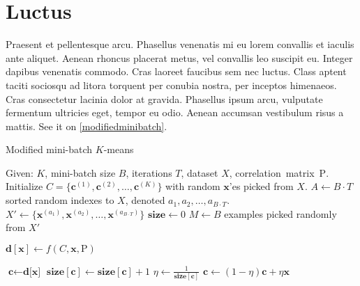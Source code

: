\section{Luctus}
Praesent et pellentesque arcu. Phasellus venenatis mi eu lorem convallis et iaculis ante aliquet. Aenean rhoncus placerat metus, vel convallis leo suscipit eu. Integer dapibus venenatis commodo. Cras laoreet faucibus sem nec luctus. Class aptent taciti sociosqu ad litora torquent per conubia nostra, per inceptos himenaeos. Cras consectetur lacinia dolor at gravida. Phasellus ipsum arcu, vulputate fermentum ultricies eget, tempor eu odio. Aenean accumsan vestibulum risus a mattis. See it on \cref{modifiedminibatch}.

\begin{algorithm}
\caption{Modified mini-batch $K$-means} \label{modifiedminibatch}
\begin{algorithmic}[1]
\State Given: $K$, mini-batch size $B$, iterations $T$, dataset $X$, correlation~matrix~$\mathrm{P}$.
\State Initialize $C = \{\mathbf{c}^{(1)}, \mathbf{c}^{(2)}, \ldots, \mathbf{c}^{(K)}\}$ with random $\mathbf{x}$'es picked from $X$.
\State $A \gets B \cdot T$ sorted random indexes to $X$, denoted $a_1, a_2, \ldots, a_{B\cdot T}$.
\State $X' \gets \{\mathbf{x}^{(a_1)}, \mathbf{x}^{(a_2)}, \ldots, \mathbf{x}^{(a_{B\cdot T})}\}$ 
\State $\textbf{size} \gets 0$
    \State $M \gets B$ examples picked randomly from $X'$
    
     
        \State $\textbf{d}[\textbf{x}] \gets f(C,\mathbf{x}, \mathrm{P})$ 
    \EndFor
    
     
        \State $\textbf{c} \gets \textbf{d[x]}$ 
        \State $\textbf{size}[\textbf{c}] \gets \textbf{size}[\textbf{c}] + 1$ 
        \State $\eta \gets \frac{1}{\textbf{size}[\textbf{c}]}$       
        \State $\textbf{c} \gets (1 - \eta)\textbf{c}+\eta\textbf{x}$ 
    \EndFor
\EndFor
\State {}
\end{algorithmic}
\end{algorithm}

